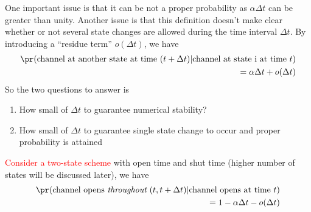 One important issue is that it can be not a proper probability as
$\alpha \Delta t$ can be greater than unity. Another issue is that
this definition doesn't make clear whether or not several state
changes are allowed during the time interval $\Delta t$. By
introducing a ``residue term'' $o(\Delta t)$, we have
\begin{equation}
  \label{eq:887}
  \begin{split}
    \pr(\text{channel at another state at time }(t+\Delta
    t)|\text{channel at
      state i at time }t) \\
    = \alpha\Delta t + o(\Delta t)
  \end{split}
\end{equation}
So the two questions to answer is
\begin{enumerate}
\item How small of $\Delta t$ to guarantee numerical stability?
\item How small of $\Delta t$ to guarantee single state change to
  occur and proper probability is attained
\end{enumerate}


\textcolor{red}{Consider a two-state scheme} with open time and shut
time (higher number of states will be discussed later), we have
\begin{equation}
  \label{eq:893}
  \begin{split}
    \pr(\text{channel opens {\it throughout} }(t,t+\Delta
    t)|\text{channel opens at time }t) \\
    = 1 - \alpha\Delta t - o(\Delta t)
  \end{split}
\end{equation}

